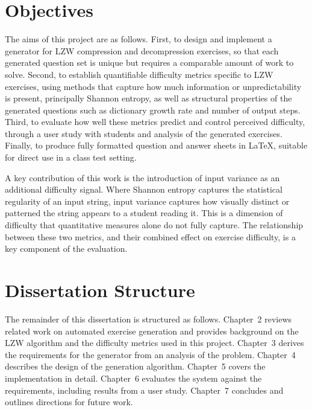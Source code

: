 \documentclass{l4proj}
\begin{document}
\section{Objectives}
 
The aims of this project are as follows. First, to design and implement a generator for LZW compression and decompression exercises, so that each generated question set is unique but requires a comparable amount of work to solve. Second, to establish quantifiable difficulty metrics specific to LZW exercises, using methods that capture how much information or unpredictability is present, principally Shannon entropy, as well as structural properties of the generated questions such as dictionary growth rate and number of output steps. Third, to evaluate how well these metrics predict and control perceived difficulty, through a user study with students and analysis of the generated exercises. Finally, to produce fully formatted question and answer sheets in LaTeX, suitable for direct use in a class test setting.
 
A key contribution of this work is the introduction of input variance as an additional difficulty signal. Where Shannon entropy captures the statistical regularity of an input string, input variance captures how visually distinct or patterned the string appears to a student reading it. This is a dimension of difficulty that quantitative measures alone do not fully capture. The relationship between these two metrics, and their combined effect on exercise difficulty, is a key component of the evaluation.
 
\section{Dissertation Structure}
 
The remainder of this dissertation is structured as follows. Chapter~2 reviews related work on automated exercise generation and provides background on the LZW algorithm and the difficulty metrics used in this project. Chapter~3 derives the requirements for the generator from an analysis of the problem. Chapter~4 describes the design of the generation algorithm. Chapter~5 covers the implementation in detail. Chapter~6 evaluates the system against the requirements, including results from a user study. Chapter~7 concludes and outlines directions for future work.
 
 
\end{document}
